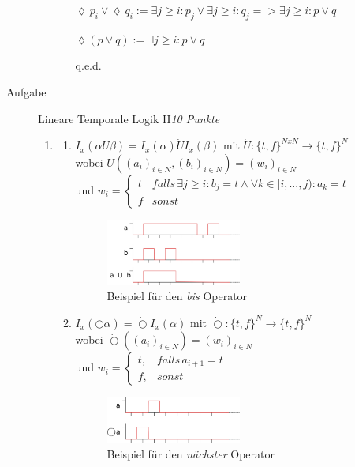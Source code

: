 \documentclass[a4paper,twoside,12pt]{article}
\newcounter{AUFGNR}
\newcommand{\AUFGABE}[2]{\vspace{0.3cm}\item[Aufgabe~\arabic{AUFGNR}]\stepcounter{AUFGNR} #1\hfill\emph{#2}}
\begin{document}
\begin{description}
\begin{enumerate}
\begin{enumerate}
$
\lozenge\, p_i \vee \lozenge\, q_i := \exists j \geq i: p_j \vee \exists j \geq i: q_j => \exists j \geq i: p \vee q
$

$
\lozenge (p \vee q) := \exists j \geq i: p \vee q
$

q.e.d.
\end{enumerate}
\end{enumerate}

\AUFGABE{Lineare Temporale Logik II}{10 Punkte}
\begin{enumerate}
\item
\begin{enumerate}
\item
$I_x(\alpha U \beta) = I_x(\alpha )\dot{U} I_x(\beta)$ mit $\dot{U}: \{t,f\}^{N x N} \rightarrow \{t,f\}^N$ \\
wobei $\dot{U}((a_i)_{i\in N}, (b_i)_{i\in N}) = (w_i)_{i\in N}$\\
und $w_i = \begin{cases} t & falls\, \exists j\geq i: b_j = t \land \forall k\in [i, ..., j): a_k = t \\ f & sonst \end{cases}$
\begin{figure}
  \includegraphics[width=0.5\textwidth]{2_a_1.png}
\caption{Beispiel für den \textit{bis} Operator}
\end{figure}  

\item
$I_x(\bigcirc \alpha) = \dot{\bigcirc} I_x(\alpha )$ mit $\dot{\bigcirc}: \{t,f\}^N \rightarrow \{t,f\}^N$ \\
wobei $\dot{\bigcirc}((a_i)_{i\in N}) = (w_i)_{i\in N}$\\
und $w_i = \begin{cases}
 t, & falls\, a_{i+1} = t\\
 f, & sonst 
 \end{cases}$  
 	\begin{figure}
 	   \includegraphics[width=0.5\textwidth]{2_a_2.png}
	\caption{Beispiel für den \textit{nächster} Operator}
 	\end{figure}


\end{enumerate}
\end{enumerate}
\end{description}
\end{document}
